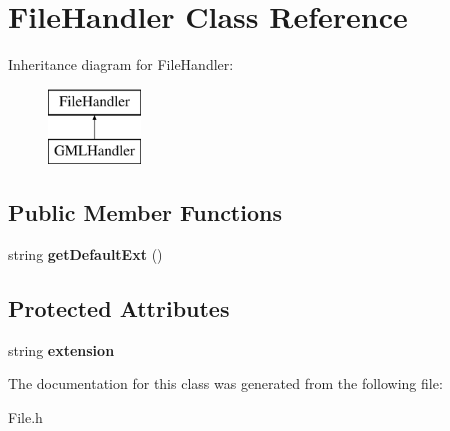 \hypertarget{class_file_handler}{}\section{File\+Handler Class Reference}
\label{class_file_handler}
Inheritance diagram for File\+Handler\+:\begin{figure}[H]
\begin{center}
\leavevmode
\includegraphics[height=2.000000cm]{class_file_handler}
\end{center}
\end{figure}
\subsection*{Public Member Functions}
\begin{DoxyCompactItemize}
\item 
\mbox{\label{class_file_handler_ae098390e45e1cf994e9ec9c713090fbd}} 
string {\bfseries get\+Default\+Ext} ()
\end{DoxyCompactItemize}
\subsection*{Protected Attributes}
\begin{DoxyCompactItemize}
\item 
\mbox{\label{class_file_handler_a39b055806a5514f19ba6efe1a3f9ccfa}} 
string {\bfseries extension}
\end{DoxyCompactItemize}


The documentation for this class was generated from the following file\+:\begin{DoxyCompactItemize}
\item 
File.\+h\end{DoxyCompactItemize}
